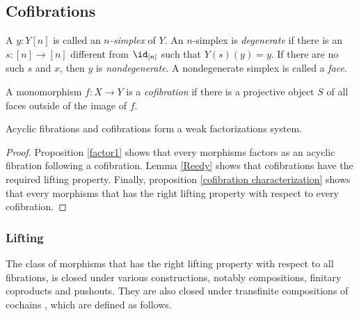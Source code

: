 \documentclass{tac}
\newcommand\hide[1]{}
\newcommand\of{:}
\begin{document}
\hide{ no witnesses }



\subsection{Cofibrations}

\begin{definition} A $y\of Y[n]$ is called an \emph{$n$-simplex} of $Y$. An $n$-simplex is \emph{degenerate} if there is an $s\of [n]\to [n]$ different from $\id_{[n]}$ such that $Y(s)(y)=y$. If there are no such $s$ and $x$, then $y$ is \emph{nondegenerate}. A nondegenerate simplex is called a \emph{face}. 

A monomorphism $f\of X\to Y$ is a \emph{cofibration} if there is a projective object $S$ of all faces outside of the image of $f$.
\end{definition}

\begin{lemma} Acyclic fibrations and cofibrations form a weak factorizations system.
\end{lemma}

\begin{proof}
Proposition \ref{factor1} shows that every morphisms factors as an acyclic fibration following a cofibration. Lemma \ref{Reedy} shows that cofibrations have the required lifting property. Finally, proposition \ref{cofibration characterization} shows that every morphisms that has the right lifting property with respect to every cofibration.
\end{proof}


\subsubsection{Lifting}
The class of morphisms that has the right lifting property with respect to all fibrations, is closed under various constructions, notably compositions, finitary coproducts and pushouts. They are also closed under transfinite compositions of cochains \hide{lemma...}, which are defined as follows.
\end{document}
